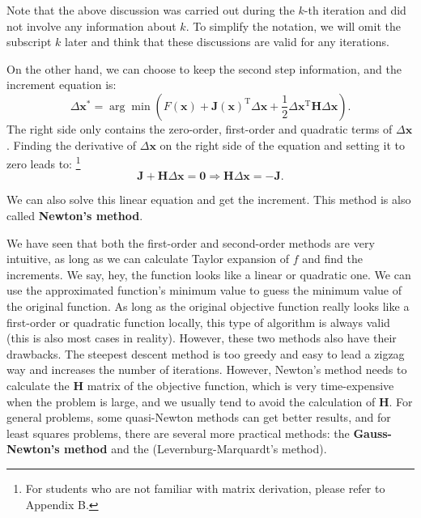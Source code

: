 Note that the above discussion was carried out during the $k$-th iteration and did not involve any information about $k$. To simplify the notation, we will omit the subscript $k$ later and think that these discussions are valid for any iterations.

On the other hand, we can choose to keep the second step information, and the increment equation is:
\begin{equation}
    \Delta \mathbf{x}^* = \arg \min \left(F\left( \mathbf{x} \right) + \mathbf{J} \left( \mathbf{x} \right)^\mathrm{ T} \Delta \mathbf{x} + \frac{1}{2}\Delta {\mathbf{x}^\mathrm{T}}\mathbf{H} \Delta \mathbf{x} \right).
\end{equation}
The right side only contains the zero-order, first-order and quadratic terms of $\Delta \mathbf{x}$. Finding the derivative of $\Delta \mathbf{x}$ on the right side of the equation and setting it to zero leads to: \footnote{For students who are not familiar with matrix derivation, please refer to Appendix B. }
\begin{equation}
    \label{eq:newton-method}
    \mathbf{J} + \mathbf{H} \Delta \mathbf{x} = \mathbf{0} \Rightarrow
    \mathbf{H} \Delta \mathbf{x} = -\mathbf{J}.
\end{equation}

We can also solve this linear equation and get the increment. This method is also called \textbf{Newton's method}.

We have seen that both the first-order and second-order methods are very intuitive, as long as we can calculate Taylor expansion of $f$ and find the increments. We say, hey, the function looks like a linear or quadratic one. We can use the approximated function's minimum value to guess the minimum value of the original function. As long as the original objective function really looks like a first-order or quadratic function locally, this type of algorithm is always valid (this is also most cases in reality). However, these two methods also have their drawbacks. The steepest descent method is too greedy and easy to lead a zigzag way and increases the number of iterations. However, Newton's method needs to calculate the $\mathbf{H}$ matrix of the objective function, which is very time-expensive when the problem is large, and we usually tend to avoid the calculation of $\mathbf{H}$. For general problems, some quasi-Newton methods can get better results, and for least squares problems, there are several more practical methods: the \textbf{Gauss-Newton's method} and the (Levernburg-Marquardt's method).

